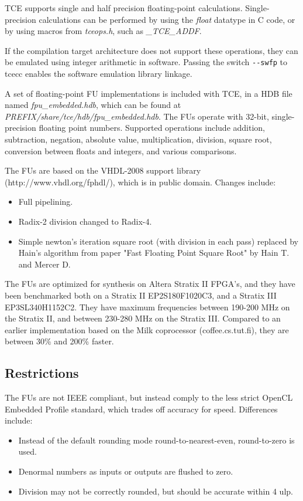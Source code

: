 \documentclass[twoside]{tceusermanual}
\begin{document}
TCE supports single and half precision floating-point calculations. Single-precision calculations
can be performed by using the \emph{float} datatype in C code, or by using macros from 
\emph{tceops.h}, such as \emph{\_TCE\_ADDF}. 

If the compilation target architecture does not support these operations, 
they can be emulated using integer arithmetic in software. Passing the switch \verb|--swfp| 
to tcecc enables the software emulation library linkage.

A set of floating-point FU implementations is included with TCE, in a HDB file named 
\emph{fpu\_embedded.hdb}, which can be found at \emph{PREFIX/share/tce/hdb/fpu\_embedded.hdb}. 
The FUs operate with 32-bit, single-precision floating point numbers. 
Supported operations include addition, subtraction, negation, absolute value, 
multiplication, division, square root, conversion between floats and integers, 
and various comparisons.

The FUs are based on the VHDL-2008 support library (http://www.vhdl.org/fphdl/), 
which is in public domain. Changes include:

\begin{itemize}
 \item Full pipelining.
 \item Radix-2 division changed to Radix-4.
 \item Simple newton's iteration square root (with division in each pass) replaced 
by Hain's algorithm from paper "Fast Floating Point Square Root" by Hain T. and Mercer D.
\end{itemize}

The FUs are optimized for synthesis on Altera Stratix II FPGA's, and they have been 
benchmarked both on a Stratix II EP2S180F1020C3, and a Stratix III 
EP3SL340H1152C2. They have maximum frequencies between 190-200 MHz on the 
Stratix II, and between 230-280 MHz on the Stratix III. 
Compared to an earlier implementation based on the Milk coprocessor 
(coffee.cs.tut.fi), they are between 30\% and 200\% faster.

\subsection{Restrictions}

The FUs are not IEEE compliant, but instead comply to the less strict OpenCL 
Embedded Profile standard, which trades off accuracy for speed. Differences include:

\begin{itemize}
    \item Instead of the default rounding mode round-to-nearest-even, round-to-zero is used.
    \item Denormal numbers as inputs or outputs are flushed to zero.
    \item Division may not be correctly rounded, but should be accurate within 4 ulp.
\end{itemize}
\end{document}
